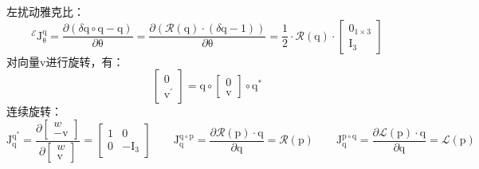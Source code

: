 \documentclass[12pt, onecolumn]{article}
\newcommand\bsm[1]{\boldsymbol{\mathrm{#1}}}
\begin{document}
	左扰动雅克比：
	\begin{equation}
	^\mathcal{E}\bsm{J}^{\bsm{q}}_{\bsm{\theta}}=\frac{\partial \left( \delta\bsm{q}\circ\bsm{q}-\bsm{q}\right) }{\partial \bsm{\theta}}
	=\frac{\partial \left( \mathcal{R}(\bsm{q})\cdot\left( \delta\bsm{q}-\bsm{1}\right) \right) }{\partial \bsm{\theta}}
	=\frac{1}{2}\cdot\mathcal{R}(\bsm{q})\cdot\begin{bmatrix}
			\bsm{0}_{1\times 3}\\\bsm{I}_3
			\end{bmatrix}
	\end{equation}
	对向量$\bsm{v}$进行旋转，有：
	\begin{equation}
	\begin{bmatrix}
		0\\\bsm{v}^\prime
		\end{bmatrix}=\bsm{q}\circ\begin{bmatrix}
	0\\\bsm{v}
	\end{bmatrix}\circ\bsm{q}^*
	\end{equation}
	连续旋转：
	\begin{equation}
	\bsm{J}^{\bsm{q}^{*}}_{\bsm{q}}=
	\frac{\partial \begin{bmatrix}
	w\\-\bsm{v}
	\end{bmatrix}}{\partial \begin{bmatrix}
		w\\\bsm{v}
		\end{bmatrix}}=\begin{bmatrix}
		1&\bsm{0}\\
		\bsm{0}&-\bsm{I}_3
		\end{bmatrix}
	\qquad
	\bsm{J}^{\bsm{q}\circ\bsm{p}}_{\bsm{q}}=
	\frac{\partial \mathcal{R}(\bsm{p})\cdot\bsm{q}}{\partial \bsm{q}}=\mathcal{R}(\bsm{p})
	\qquad
	\bsm{J}^{\bsm{p}\circ\bsm{q}}_{\bsm{q}}=
	\frac{\partial \mathcal{L}(\bsm{p})\cdot\bsm{q}}{\partial \bsm{q}}=\mathcal{L}(\bsm{p})
	\end{equation}
	
\end{document}
